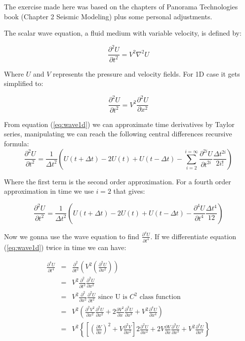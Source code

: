 \documentclass[legalpaper, 12pt]{book}
\begin{document}
The exercise made here was based on the chapters of Panorama Technologies book (Chapter 2 Seismic Modeling) plus some personal adjustments.

The scalar wave equation, a fluid medium with variable velocity, is defined by:

\[ \frac{\partial^2 U}{\partial t^2} = V^2 \nabla^2 U \]

Where $U$ and $V$ represents the pressure and velocity fields. For 1D case it gets simplified to:

\begin{equation}
\frac{\partial^2 U}{\partial t^2} = V^2 \frac{\partial^2 U}{\partial x^2}
\label{eq:wave1d}
\end{equation}

From equation (\ref{eq:wave1d}) we can approximate time derivatives by Taylor series, manipulating we can reach the following  central differences recursive formula:
\[ \frac{\partial^2 U}{\partial t^2} = \frac{1}{\Delta t^2} \left( U(t+\Delta t) -2 U(t) + U(t-\Delta t) - \sum_{i=2}^{i=\infty} \frac{\partial^{2i} U}{\partial t^{2i}} \frac{\Delta t^{2i}}{2i!} \right) \]

Where the first term is the second order approximation. For a fourth order approximation in time we use $i=2$ that gives:

\begin{equation}
\frac{\partial^2 U}{\partial t^2} = \frac{1}{\Delta t^2} \left( U(t+\Delta t) -2 U(t) + U(t-\Delta t) - \frac{\partial^{4} U}{\partial t^{4}} \frac{\Delta t^{4}}{12}\right)
\label{eq:partial4}
\end{equation}

Now we gonna use the wave equation to find $\frac{\partial^{4} U}{\partial t^{4}}$. If we differentiate equation (\ref{eq:wave1d}) twice in time we can have:

\begin{eqnarray}
\frac{\partial^4 U}{\partial t^4} &=& \frac{\partial^2 }{\partial t^2} \left( V^2 \left( \frac{\partial^2 U}{\partial x^2} \right) \right) \nonumber \\
& =&  V^2 \frac{\partial^2 }{\partial t^2} \frac{\partial^2 U}{\partial x^2} \nonumber \\
&=&  V^2 \frac{\partial^2 }{\partial x^2} \frac{\partial^2 U}{\partial t^2}  \mbox { since U is $C^2$ class function } \nonumber \\
&=& V^2 \left( \frac{\partial^2 V^2}{\partial x^2} \frac{\partial^2 U}{\partial x^2} + 2 \frac{\partial V^2}{\partial x} \frac{\partial^3 U}{\partial x^3} + V^2 \frac{\partial^4 U}{\partial x^4} \right) \nonumber \\
&=& V^2 \left\{ \left[ \left(  \frac{\partial V}{\partial x} \right)^2 + V  \frac{\partial^2 V}{\partial x^2} \right] 2 \frac{\partial^2 U}{\partial x^2} + 2 V \frac{\partial V}{\partial x}  \frac{\partial^3 U}{\partial x^3} +  V^2 \frac{\partial^4 U}{\partial x^4}\right\}
\label{eq:partial4final}
\end{eqnarray}
\end{document}
